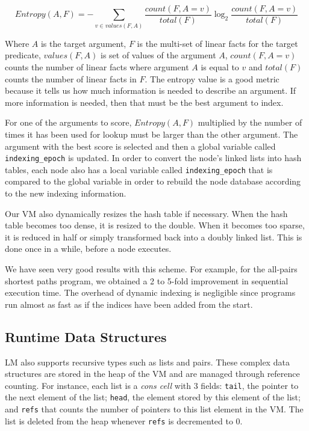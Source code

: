{\tiny
\[
Entropy(A, F) = - \sum_{v \in values(F, A)} \frac{count(F, A = v)}{total(F)} \log_2 \frac{count(F, A = v)}{total(F)}
\]
}

Where $A$ is the target argument, $F$ is the multi-set of linear facts
for the target predicate, $values(F, A)$ is set of values of the
argument $A$, $count(F, A = v)$ counts the number of linear facts
where argument $A$ is equal to $v$ and $total(F)$ counts the number of
linear facts in $F$.  The entropy value is a good metric because it
tells us how much information is needed to describe an argument.  If
more information is needed, then that must be the best argument to
index.

For one of the arguments to score, $Entropy(A, F)$ multiplied by the
number of times it has been used for lookup must be larger than the
other argument. The argument with the best score is selected and then
a global variable called \texttt{indexing\_epoch} is updated.  In
order to convert the node's linked lists into hash tables, each node
also has a local variable called \texttt{indexing\_epoch} that is
compared to the global variable in order to rebuild the node database
according to the new indexing information.

Our VM also dynamically resizes the hash table if necessary. When the
hash table becomes too dense, it is resized to the double. When it
becomes too sparse, it is reduced in half or simply transformed back
into a doubly linked list. This is done once in a while, before a node
executes.

We have seen very good results with this scheme. For example, for the
all-pairs shortest paths program, we obtained a 2 to 5-fold
improvement in sequential execution time.  The overhead of dynamic
indexing is negligible since programs run almost as fast as if the
indices have been added from the start.


\subsection{Runtime Data Structures}

LM also supports recursive types such as lists and pairs. These
complex data structures are stored in the heap of the VM and are
managed through reference counting. For instance, each list is
a \emph{cons cell} with 3 fields: \texttt{tail}, the pointer to the
next element of the list; \texttt{head}, the element stored by this
element of the list; and \texttt{refs} that counts the number of
pointers to this list element in the VM. The list is deleted from the
heap whenever \texttt{refs} is decremented to 0.
